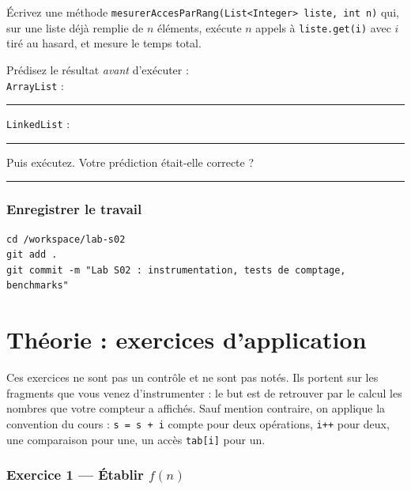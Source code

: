 \documentclass[11pt,a4paper]{article}
\newcommand{\lig}[1]{\rule{#1}{0.4pt}}
\begin{document}
\begin{exercicebox}
Écrivez une méthode \texttt{mesurerAccesParRang(List<Integer> liste, int n)}
qui, sur une liste déjà remplie de $n$ éléments, exécute $n$ appels à
\texttt{liste.get(i)} avec $i$ tiré au hasard, et mesure le temps total.

Prédisez le résultat \emph{avant} d'exécuter :\\
\texttt{ArrayList} : \lig{5cm} \quad \texttt{LinkedList} : \lig{5cm}

Puis exécutez. Votre prédiction était-elle correcte ? \lig{6cm}
\end{exercicebox}

\section{Enregistrer le travail}

\begin{lstlisting}[style=bash,caption={Git}]
cd /workspace/lab-s02
git add .
git commit -m "Lab S02 : instrumentation, tests de comptage, benchmarks"
\end{lstlisting}

\newpage
\part{Théorie : exercices d'application}

\begin{infobox}
Ces exercices ne sont pas un contrôle et ne sont pas notés. Ils portent sur
les fragments que vous venez d'instrumenter : le but est de retrouver par le
calcul les nombres que votre compteur a affichés. Sauf mention contraire, on
applique la convention du cours : \texttt{s = s + i} compte pour deux
opérations, \texttt{i++} pour deux, une comparaison pour une, un accès
\texttt{tab[i]} pour un.
\end{infobox}

\section{Exercice 1 --- Établir $f(n)$}
\end{document}

